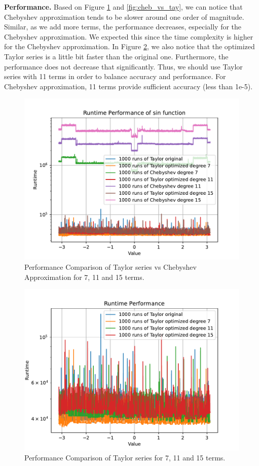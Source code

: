 \documentclass[12pt]{article}
\begin{document}
\textbf{Performance.}
Based on Figure \ref{fig:perf_inc} and \ref{fig:cheb_vs_tay}, we can notice that Chebyshev approximation tends to be slower around one order of magnitude.
Similar, as we add more terms, the performance decreases, especially for the Chebyshev approximation.
We expected this since the time complexity is higher for the Chebyshev approximation.
In Figure \ref{fig:perf_orig_opt}, we also notice that the optimized Taylor series  is a little bit faster than the original one. Furthermore, the performance does not decrease that significantly.
Thus, we should use Taylor series with 11 terms in order to balance accuracy and performance.
For Chebyshev approximation, 11 terms provide sufficient accuracy (less than 1e-5).
\begin{figure}[h]
    \centering
    \includegraphics[width=\textwidth]{plots/performance/inc_rel_pi_001.pdf}
    \caption{Performance Comparison of Taylor series vs Chebyshev Approximation for 7, 11 and 15 terms.}
    \label{fig:perf_inc}
  \end{figure}

\begin{figure}[h]
    \centering
    \includegraphics[width=\textwidth]{plots/performance/inc_rel_pi_tay_orig_vs_opt.pdf}
    \caption{Performance Comparison of Taylor series for 7, 11 and 15 terms.}
    \label{fig:perf_orig_opt}
\end{figure}
\end{document}
